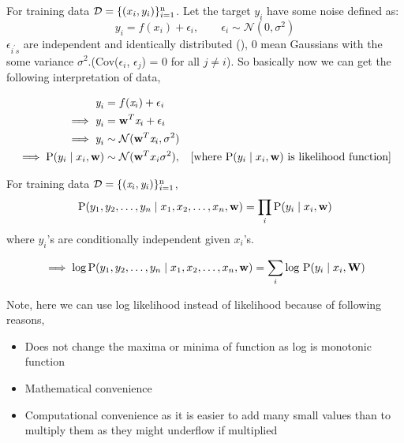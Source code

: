 For training data $\mathcal{D} = \{(x_{i}, y_{i})\}^{\text{n}}_{i=1}$. Let the target $y_{i}$ have some noise defined as: $$y_{i} = f(x_{i}) + \epsilon_{i}, \qquad \epsilon_{i} \sim \mathcal{N}(0,\sigma^{2})$$
$\epsilon_{i^{'}s}$ are independent and identically distributed (), 0 mean Gaussians with the some variance $\sigma^{2}$.(Cov($\epsilon_{i}$, $\epsilon_{j}$) = 0 for all $j \neq i$).
So basically now we can get the following interpretation of data,

\begin{align*}
  \textit{y}_i                               & = f(\textit{x}_i) + \epsilon_i                                                                                                               \\
  \implies \textit{y}_i                      & = \tc{w}^T\textit{x}_i + \epsilon_i                 &                                                                                        \\
  \implies \textit{y}_i                      & \sim \mathcal{N}(\tc{w}^{T}\textit{x}_i , \sigma^2)                                                                                          \\
  \implies \text{P}(y_{i}\mid x_{i}, \tc{w}) & \sim \mathcal{N}(\tc{w}^{T}x_{i} \sigma^{2}),       & \hfill \text{[where }\text{P}(y_{i}\mid x_{i}, \tc{w}) \text{ is likelihood function]}
\end{align*}

For training data $\mathcal{D} = \{(\mathit{x}_{i}, \mathit{y}_{i})\}^{\text{n}}_{i=1}$,
$$
  \text{P}(y_{1}, y_{2}, \ldots, y_{n}\mid x_{1}, x_{2}, \ldots, x_{n}, \textbf{w}) = \prod_{i}\text{P}(y_{i}\mid x_{i}, \textbf{w})
$$
where $y_{i}$'s are conditionally independent given $x_{i}$'s.

$$
  \implies \log\text{P}(y_{1}, y_{2}, \ldots, y_{n}\mid x_{1}, x_{2}, \ldots, x_{n}, \textbf{w}) = \sum_{i}\text{log P}(y_{i} \mid x_{i}, \textbf{W})
$$

Note, here we can use log likelihood instead of likelihood because of following reasons,
\begin{itemize}
  \item Does not change the maxima or minima of function as log is monotonic function
  \item Mathematical convenience
  \item Computational convenience as it is easier to add many small values than to multiply them as they might underflow if multiplied
\end{itemize}